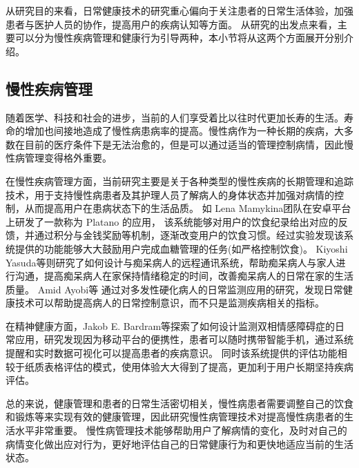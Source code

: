 从研究目的来看，日常健康技术的研究重心偏向于关注患者的日常生活体验，加强患者与医护人员的协作，提高用户的疾病认知等方面\cite{nunes2015self-care}。
从研究的出发点来看，主要可以分为慢性疾病管理和健康行为引导两种\cite{nunes2015self-care}，本小节将从这两个方面展开分别介绍。

\subsection{慢性疾病管理}
随着医学、科技和社会的进步，当前的人们享受着比以往时代更加长寿的生活\cite{OlshanskyDEMOGRAPHY}。寿命的增加也间接地造成了慢性病患病率的提高\cite{world2012world}。慢性病作为一种长期的疾病，大多数在目前的医疗条件下是无法治愈的，但是可以通过适当的管理控制病情，因此慢性病管理变得格外重要。

在慢性疾病管理方面，当前研究主要是关于各种类型的慢性疾病的长期管理和追踪技术，用于支持慢性病患者及其护理人员了解病人的身体状态并加强对病情的控制，从而提高用户在患病状态下的生活品质。
如 Lena Mamykina\cite{burgermaster2019personal}团队在安卓平台上研发了一款称为 Platano 的应用，
该系统能够对用户的饮食纪录给出对应的反馈，并通过积分与金钱奖励等机制，逐渐改变用户的饮食习惯。经过实验发现该系统提供的功能能够大大鼓励用户完成血糖管理的任务(如严格控制饮食)。
Kiyoshi Yasuda等\cite{lazar2016evaluation}则研究了如何设计与痴呆病人的远程通讯系统，帮助痴呆病人与家人进行沟通，提高痴呆病人在家保持情绪稳定的时间，改善痴呆病人的日常在家的生活质量。
Amid Ayobi等\cite{ayobi2017quantifying} 通过对多发性硬化病人的日常监测应用的研究，发现日常健康技术可以帮助提高病人的日常控制意识，而不只是监测疾病相关的指标。

在精神健康方面，Jakob E. Bardram等\cite{bardram2013designing}探索了如何设计监测双相情感障碍症的日常应用，研究发现因为移动平台的便携性，患者可以随时携带智能手机，通过系统提醒和实时数据可视化可以提高患者的疾病意识。
同时该系统提供的评估功能相较于纸质表格评估的模式，使用体验大大得到了提高，更加利于用户长期坚持疾病评估。

总的来说，健康管理和患者的日常生活密切相关，慢性病患者需要调整自己的饮食和锻炼等来实现有效的健康管理\cite{nunes2018understanding}，因此研究慢性病管理技术对提高慢性病患者的生活水平非常重要。
慢性病管理技术能够帮助用户了解病情的变化，及时对自己的病情变化做出应对行为，更好地评估自己的日常健康行为和更快地适应当前的生活状态\cite{ayobi2017quantifying}。


